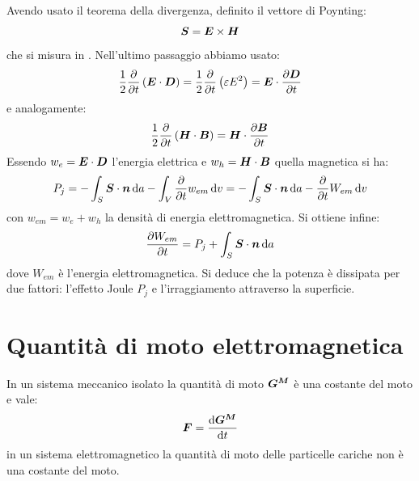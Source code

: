 Avendo usato il teorema della divergenza, definito il vettore di Poynting:
\begin{equation}
\boldsymbol{S}=\boldsymbol{E}\times\boldsymbol{H}
\end{equation}
che si misura in \watt\per\meter\squared. Nell'ultimo passaggio abbiamo usato:
\begin{equation}
\frac{1}{2}\frac{\partial}{\partial t}\left(\boldsymbol{E}\cdot\boldsymbol{D}\right)=\frac{1}{2}\frac{\partial}{\partial t}\left(\varepsilon E^2\right)=\boldsymbol{E}\cdot\frac{\partial\boldsymbol{D}}{\partial t}
\end{equation}
e analogamente:
\begin{equation}
\frac{1}{2}\frac{\partial}{\partial t}\left(\boldsymbol{H}\cdot\boldsymbol{B}\right)=\boldsymbol{H}\cdot\frac{\partial\boldsymbol{B}}{\partial t}
\end{equation}
Essendo $w_e=\boldsymbol{E}\cdot\boldsymbol{D}$ l'energia elettrica e $w_h=\boldsymbol{H}\cdot\boldsymbol{B}$ quella magnetica si ha:
\begin{equation}
P_j=-\int_S\boldsymbol{S}\cdot\boldsymbol{n}\,\mathrm{d} a-\int_V\frac{\partial}{\partial t}{w_{em}}\,\mathrm{d} v=-\int_S\boldsymbol{S}\cdot\boldsymbol{n}\,\mathrm{d} a-\frac{\partial}{\partial t}{W_{em}}\,\mathrm{d} v
\end{equation}
con $w_{em}=w_e+w_h$ la densità di energia elettromagnetica. Si ottiene infine:
\begin{equation}
\frac{\partial W_{em}}{\partial t}=P_j+\int_S\boldsymbol{S}\cdot\boldsymbol{n}\,\mathrm{d} a
\end{equation}
dove $W_{em}$ è l'energia elettromagnetica. Si deduce che la potenza è dissipata per due fattori: l'effetto Joule $P_j$ e l'irraggiamento attraverso la superficie.
\section{Quantità di moto elettromagnetica}
In un sistema meccanico isolato la quantità di moto $\boldsymbol{G^M}$ è una costante del moto e vale:
\begin{equation}
\boldsymbol{F}=\frac{\mathrm{d} \boldsymbol{G^M}}{\mathrm{d} t}
\end{equation}
in un sistema elettromagnetico la quantità di moto delle particelle cariche non è una costante del moto.

